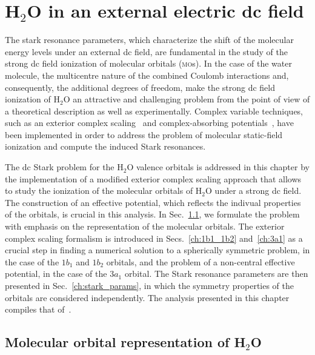 \chapter{H$_{2}$O in an external electric dc field}
\label{ch:dc_h2o}


The stark resonance parameters, which characterize the shift of the
molecular energy levels under an external dc field, are fundamental in
the study of the strong dc field ionization of molecular orbitals
(\textsc{mo}s). In the case of the water molecule, the multicentre
nature of the combined Coulomb interactions and, consequently, the
additional degrees of freedom, make the strong dc field ionization of
H$_{2}$O an attractive and challenging problem from the point of view
of a theoretical description as well as experimentally. Complex
variable techniques, such as an exterior complex
scaling~\cite{Simon_1979,ecsScrinzi} and complex-absorbing
potentials~\cite{RissMeyer_1993,Krause_2014}, have been implemented in
order to address the problem of molecular static-field ionization and
compute the induced Stark resonances.

The dc Stark problem for the H$_{2}$O valence orbitals is addressed in
this chapter by the implementation of a modified exterior complex
scaling approach that allows to study the ionization of the molecular
orbitals of H$_{2}$O under a strong dc field. The construction of an
effective potential, which reflects the indivual properties of the
orbitals, is crucial in this analysis. In Sec.~\ref{ch:h2o_structure},
we formulate the problem with emphasis on the representation of the
molecular orbitals. The exterior complex scaling formalism is
introduced in Secs.~\ref{ch:1b1_1b2} and~\ref{ch:3a1} as a crucial
step in finding a numerical solution to a spherically symmetric
problem, in the case of the $1b_{1}$ and $1b_{2}$ orbitals, and the
problem of a non-central effective potential, in the case of the
$3a_{1}$ orbital. The Stark resonance parameters are then presented in
Sec.~\ref{ch:stark_params}, in which the symmetry properties of the
orbitals are considered independently. The analysis presented in this
chapter compiles that of~\cite{sarias_2016,sarias_2017}.


\section{Molecular orbital representation of H$_{2}$O}
\label{ch:h2o_structure}

